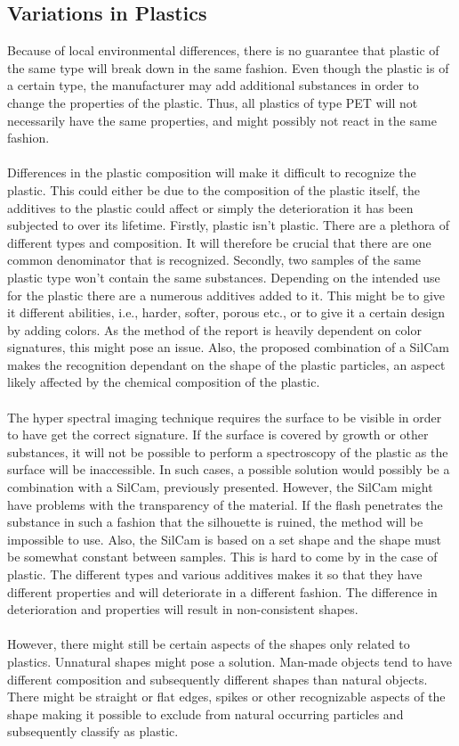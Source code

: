 \subsection{Variations in Plastics}
Because of local environmental differences, there is no guarantee that plastic of the same type will break down in the same fashion. Even though the plastic is of a certain type, the manufacturer may add additional substances in order to change the properties of the plastic. Thus, all plastics of type PET will not necessarily have the same properties, and might possibly not react in the same fashion.
\\\\
Differences in the plastic composition will make it difficult to recognize the plastic. This could either be due to the composition of the plastic itself, the additives to the plastic could affect or simply the deterioration it has been subjected to over its lifetime. Firstly, plastic isn't plastic. There are a plethora of different types and composition. It will therefore be crucial that there are one common denominator that is recognized. Secondly, two samples of the same plastic type won't contain the same substances. Depending on the intended use for the plastic there are a numerous additives added to it. This might be to give it different abilities, i.e., harder, softer, porous etc., or to give it a certain design by adding colors. As the method of the report is heavily dependent on color signatures, this might pose an issue. Also, the proposed combination of a SilCam makes the recognition dependant on the shape of the plastic particles, an aspect likely affected by the chemical composition of the plastic.
\\\\
The hyper spectral imaging technique requires the surface to be visible in order to have get the correct signature. If the surface is covered by growth or other substances, it will not be possible to perform a spectroscopy of the plastic as the surface will be inaccessible. In such cases, a possible solution would possibly be a combination with a SilCam, previously presented. However, the SilCam might have problems with the transparency of the material. If the flash penetrates the substance in such a fashion that the silhouette is ruined, the method will be impossible to use. Also, the SilCam is based on a set shape and the shape must be somewhat constant between samples. This is hard to come by in the case of plastic. The different types and various additives makes it so that they have different properties and will deteriorate in a different fashion. The difference in deterioration and properties will result in non-consistent shapes. \\\\
However, there might still be certain aspects of the shapes only related to plastics. Unnatural shapes might pose a solution. Man-made objects tend to have different composition and subsequently different shapes than natural objects. There might be straight or flat edges, spikes or other recognizable aspects of the shape making it possible to exclude from natural occurring particles and subsequently classify as plastic.


